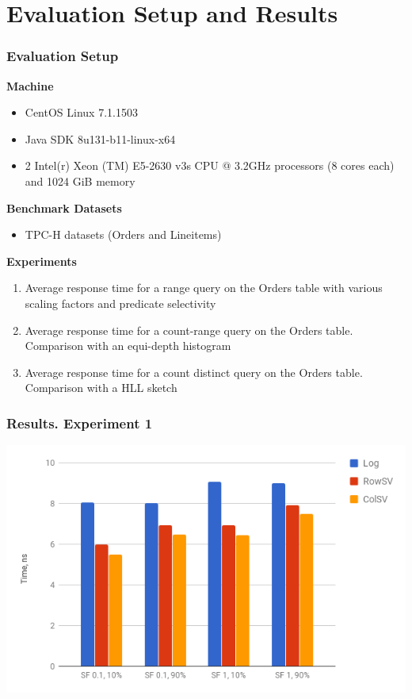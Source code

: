 \documentclass{beamer}
\begin{document}
\section{Evaluation Setup and Results}
\begin{frame}
\frametitle{Evaluation Setup}
\textbf{Machine}
\begin{itemize}
\item{CentOS Linux 7.1.1503}
\item{Java SDK 8u131-b11-linux-x64}
\item{2 Intel(r) Xeon (TM) E5-2630 v3s CPU @ 3.2GHz processors (8 cores each) and 1024 GiB memory}
\end{itemize}
\textbf{Benchmark Datasets}
\begin{itemize}
\item{TPC-H datasets (Orders and Lineitems)}
\end{itemize}
\textbf{Experiments}
\begin{enumerate}
\item{Average response time for a range query on the Orders table with various scaling factors and predicate selectivity}
\item{Average response time for a count-range query on the Orders table. Comparison with an equi-depth histogram}
\item{Average response time for a count distinct query on the Orders table. Comparison with a HLL sketch}
\end{enumerate}
\end{frame}

\begin{frame}
\frametitle{Results. Experiment 1}
\centering
\includegraphics[scale=0.5]{img/exp1.png}
\end{frame}
\end{document}
